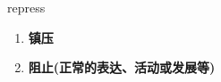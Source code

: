 
\begin{frame}
{\huge repress}
\begin{center}
\begin{enumerate}\Large
  \item \textbf{镇压}
  \item \textbf{阻止(正常的表达、活动或发展等)}
\end{enumerate}
\end{center}
\end{frame}
